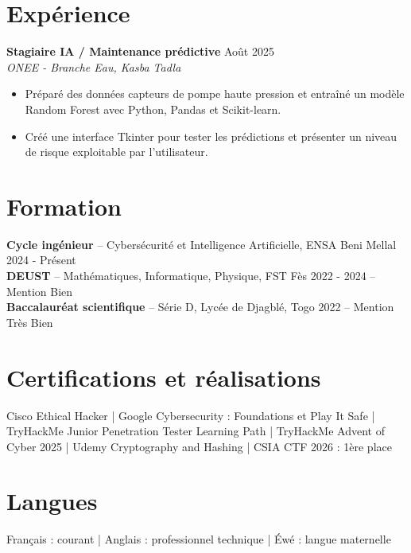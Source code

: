 \documentclass[10pt,a4paper]{article}
\newcommand{\role}[3]{%
  \textbf{#1} \hfill #3\\
  \textit{#2}\vspace{1pt}
}
\newcommand{\edu}[4]{%
  \textbf{#1} -- #2 \hfill #3 #4\\[-1pt]
}
\begin{document}
\section{Expérience}
\role{Stagiaire IA / Maintenance prédictive}{ONEE - Branche Eau, Kasba Tadla}{Août 2025}
\begin{itemize}
  \item Préparé des données capteurs de pompe haute pression et entraîné un modèle Random Forest avec Python, Pandas et Scikit-learn.
  \item Créé une interface Tkinter pour tester les prédictions et présenter un niveau de risque exploitable par l'utilisateur.
\end{itemize}

\section{Formation}
\edu{Cycle ingénieur}{Cybersécurité et Intelligence Artificielle, ENSA Beni Mellal}{2024 - Présent}{}
\edu{DEUST}{Mathématiques, Informatique, Physique, FST Fès}{2022 - 2024}{-- Mention Bien}
\edu{Baccalauréat scientifique}{Série D, Lycée de Djagblé, Togo}{2022}{-- Mention Très Bien}

\section{Certifications et réalisations}
Cisco Ethical Hacker | Google Cybersecurity : Foundations et Play It Safe | TryHackMe Junior Penetration Tester Learning Path | TryHackMe Advent of Cyber 2025 | Udemy Cryptography and Hashing | CSIA CTF 2026 : 1ère place

\section{Langues}
Français : courant | Anglais : professionnel technique | Éwé : langue maternelle
\end{document}
